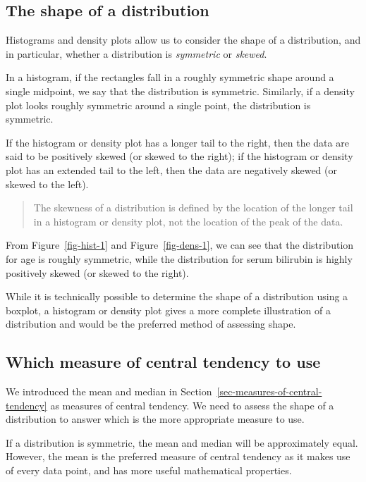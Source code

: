 \documentclass[
  a4paper,
]{memoir}
\begin{document}
\hypertarget{the-shape-of-a-distribution}{%
\subsection{The shape of a
distribution}\label{the-shape-of-a-distribution}}

Histograms and density plots allow us to consider the shape of a
distribution, and in particular, whether a distribution is
\emph{symmetric} or \emph{skewed}.

In a histogram, if the rectangles fall in a roughly symmetric shape
around a single midpoint, we say that the distribution is symmetric.
Similarly, if a density plot looks roughly symmetric around a single
point, the distribution is symmetric.

If the histogram or density plot has a longer tail to the right, then
the data are said to be positively skewed (or skewed to the right); if
the histogram or density plot has an extended tail to the left, then the
data are negatively skewed (or skewed to the left).

\begin{quote}
The skewness of a distribution is defined by the location of the longer
tail in a histogram or density plot, not the location of the peak of the
data.
\end{quote}

From Figure~\ref{fig-hist-1} and Figure~\ref{fig-dens-1}, we can see
that the distribution for age is roughly symmetric, while the
distribution for serum bilirubin is highly positively skewed (or skewed
to the right).

While it is technically possible to determine the shape of a
distribution using a boxplot, a histogram or density plot gives a more
complete illustration of a distribution and would be the preferred
method of assessing shape.

\hypertarget{which-measure-of-central-tendency-to-use}{%
\subsection{Which measure of central tendency to
use}\label{which-measure-of-central-tendency-to-use}}

We introduced the mean and median in
Section~\ref{sec-measures-of-central-tendency} as measures of central
tendency. We need to assess the shape of a distribution to answer which
is the more appropriate measure to use.

If a distribution is symmetric, the mean and median will be
approximately equal. However, the mean is the preferred measure of
central tendency as it makes use of every data point, and has more
useful mathematical properties.
\end{document}

